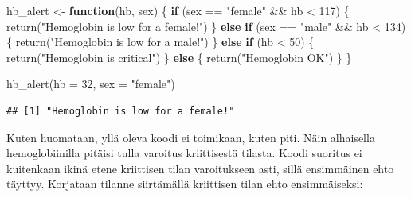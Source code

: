 \documentclass[
]{book}
\newenvironment{Shaded}{\begin{snugshade}}{\end{snugshade}}
\newcommand{\AttributeTok}[1]{\textcolor[rgb]{0.77,0.63,0.00}{#1}}
\newcommand{\ControlFlowTok}[1]{\textcolor[rgb]{0.13,0.29,0.53}{\textbf{#1}}}
\newcommand{\DecValTok}[1]{\textcolor[rgb]{0.00,0.00,0.81}{#1}}
\newcommand{\FunctionTok}[1]{\textcolor[rgb]{0.00,0.00,0.00}{#1}}
\newcommand{\NormalTok}[1]{#1}
\newcommand{\OtherTok}[1]{\textcolor[rgb]{0.56,0.35,0.01}{#1}}
\newcommand{\SpecialCharTok}[1]{\textcolor[rgb]{0.00,0.00,0.00}{#1}}
\newcommand{\StringTok}[1]{\textcolor[rgb]{0.31,0.60,0.02}{#1}}
\begin{document}
\begin{Shaded}
\begin{Highlighting}[]
\NormalTok{hb\_alert }\OtherTok{\textless{}{-}} \ControlFlowTok{function}\NormalTok{(hb, sex) \{}
  \ControlFlowTok{if}\NormalTok{ (sex }\SpecialCharTok{==} \StringTok{"female"} \SpecialCharTok{\&\&}\NormalTok{ hb }\SpecialCharTok{\textless{}} \DecValTok{117}\NormalTok{) \{}
    \FunctionTok{return}\NormalTok{(}\StringTok{"Hemoglobin is low for a female!"}\NormalTok{)}
\NormalTok{  \} }\ControlFlowTok{else} \ControlFlowTok{if}\NormalTok{ (sex }\SpecialCharTok{==} \StringTok{"male"} \SpecialCharTok{\&\&}\NormalTok{ hb }\SpecialCharTok{\textless{}} \DecValTok{134}\NormalTok{) \{}
    \FunctionTok{return}\NormalTok{(}\StringTok{"Hemoglobin is low for a male!"}\NormalTok{)}
\NormalTok{  \} }\ControlFlowTok{else} \ControlFlowTok{if}\NormalTok{ (hb }\SpecialCharTok{\textless{}} \DecValTok{50}\NormalTok{) \{}
    \FunctionTok{return}\NormalTok{(}\StringTok{"Hemoglobin is critical"}\NormalTok{)}
\NormalTok{  \} }\ControlFlowTok{else}\NormalTok{ \{}
    \FunctionTok{return}\NormalTok{(}\StringTok{"Hemoglobin OK"}\NormalTok{)}
\NormalTok{  \}}
\NormalTok{\}}

\FunctionTok{hb\_alert}\NormalTok{(}\AttributeTok{hb =} \DecValTok{32}\NormalTok{, }\AttributeTok{sex =} \StringTok{"female"}\NormalTok{)}
\end{Highlighting}
\end{Shaded}

\begin{verbatim}
## [1] "Hemoglobin is low for a female!"
\end{verbatim}

Kuten huomataan, yllä oleva koodi ei toimikaan, kuten piti. Näin alhaisella hemoglobiinilla pitäisi tulla varoitus kriittisestä tilasta. Koodi suoritus ei kuitenkaan ikinä etene kriittisen tilan varoitukseen asti, sillä ensimmäinen ehto täyttyy. Korjataan tilanne siirtämällä kriittisen tilan ehto ensimmäiseksi:
\end{document}
